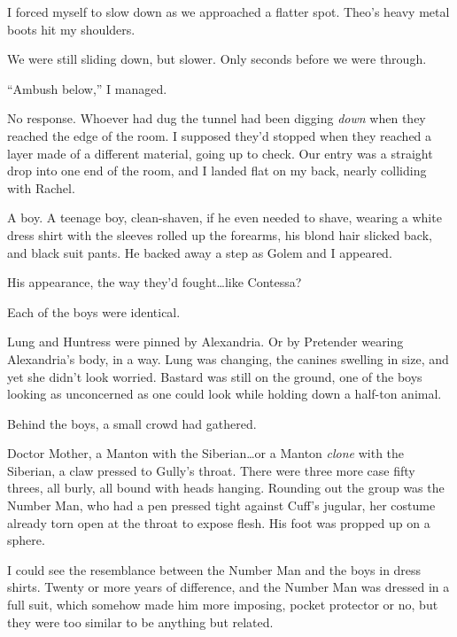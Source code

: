 I forced myself to slow down as we approached a flatter spot.  Theo's heavy metal boots hit my shoulders.



We were still sliding down, but slower.  Only seconds before we were through.



``Ambush below,'' I managed.



No response.  Whoever had dug the tunnel had been digging \emph{down} when they reached the edge of the room.  I supposed they'd stopped when they reached a layer made of a different material, going up to check.  Our entry was a straight drop into one end of the room, and I landed flat on my back, nearly colliding with Rachel.



A boy.  A teenage boy, clean-shaven, if he even needed to shave, wearing a white dress shirt with the sleeves rolled up the forearms, his blond hair slicked back, and black suit pants.  He backed away a step as Golem and I appeared.



His appearance, the way they'd fought\ldots like Contessa?



Each of the boys were identical.



Lung and Huntress were pinned by Alexandria.  Or by Pretender wearing Alexandria's body, in a way.  Lung was changing, the canines swelling in size, and yet she didn't look worried.  Bastard was still on the ground, one of the boys looking as unconcerned as one could look while holding down a half-ton animal.



Behind the boys, a small crowd had gathered.



Doctor Mother, a Manton with the Siberian\ldots or a Manton \emph{clone} with the Siberian, a claw pressed to Gully's throat.  There were three more case fifty threes, all burly, all bound with heads hanging.  Rounding out the group was the Number Man, who had a pen pressed tight against Cuff's jugular, her costume already torn open at the throat to expose flesh.  His foot was propped up on a sphere.



I could see the resemblance between the Number Man and the boys in dress shirts.  Twenty or more years of difference, and the Number Man was dressed in a full suit, which somehow made him more imposing, pocket protector or no, but they were too similar to be anything but related.



